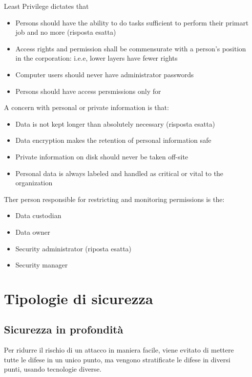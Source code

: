 
Least Privilege dictates that
\begin{itemize}
  \item Persons should have the ability to do tasks sufficient to perform their 
  primart job and no more (risposta esatta)
  \item Access rights and permission shall be commensurate with a person's 
  position in the corporation: i.e.e, lower layers have fewer rights
  \item Computer users should never have administrator passwords
  \item Persons should have access persmissions only for %
\end{itemize}


A concern with personal or private information is that:
\begin{itemize}
  \item Data is not kept longer than absolutely necessary (risposta esatta)
  \item Data encryption makes the retention of personal information safe
  \item Private information on disk should never be taken off-site
  \item Personal data is always labeled and handled as critical or vital to the 
  organization
\end{itemize}


Ther person responsible for restricting and monitoring permissions is the:
\begin{itemize}
  \item Data custodian
  \item Data owner
  \item Security administrator (riposta esatta)
  \item Security manager
\end{itemize}

\section{Tipologie di sicurezza}

\subsection{Sicurezza in profondità}

Per ridurre il rischio di un attacco in maniera facile, viene evitato di 
mettere tutte le difese in un unico punto, ma vengono stratificate le difese in 
diversi punti, usando tecnologie diverse.